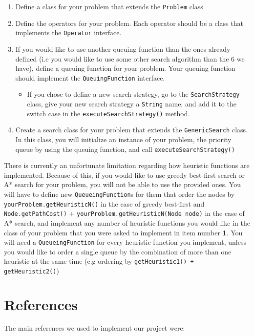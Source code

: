 \documentclass{article}
\begin{document}
\begin{enumerate}
\item Define a class for your problem that extends the \texttt{Problem} class
\item Define the operators for your problem. Each operator should be a class that implements the \texttt{Operator} interface.
\item If you would like to use another queuing function than the ones already defined (i.e you would like to use some other search algorithm than the 6 we have), define a queuing function for your problem. Your queuing function should implement the \texttt{QueuingFunction} interface.
\begin{itemize}
\item If you chose to define a new search strategy, go to the \texttt{SearchStrategy} class, give your new search strategy a \texttt{String} name, and add it to the switch case in the \texttt{executeSearchStrategy()} method.
\end{itemize}
\item Create a search class for your problem that extends the \texttt{GenericSearch} class. In this class, you will initialize an instance of your problem, the priority queue by using the queuing function, and call \texttt{executeSearchStrategy()}
\end{enumerate}

There is currently an unfortunate limitation regarding how heuristic functions are implemented. Because of this, if you would like to use greedy best-first search or A* search for your problem, you will not be able to use the provided ones. You will have to define new \texttt{QueueingFunction}s for them that order the nodes by \texttt{yourProblem.getHeuristicN()} in the case of greedy best-first and \texttt{Node.getPathCost()} + \texttt{yourProblem.getHeuristicN(Node node)} in the case of A* search, and implement any number of heuristic functions you would like in the class of your problem that you were asked to implement in item number \textbf{1}. You will need a \texttt{QueueingFunction} for every heuristic function you implement, unless you would like to order a single queue by the combination of more than one heuristic at the same time (e.g ordering by \texttt{getHeuristic1() + getHeuristic2()})

\section{References}
The main references we used to implement our project were: 
\end{document}
